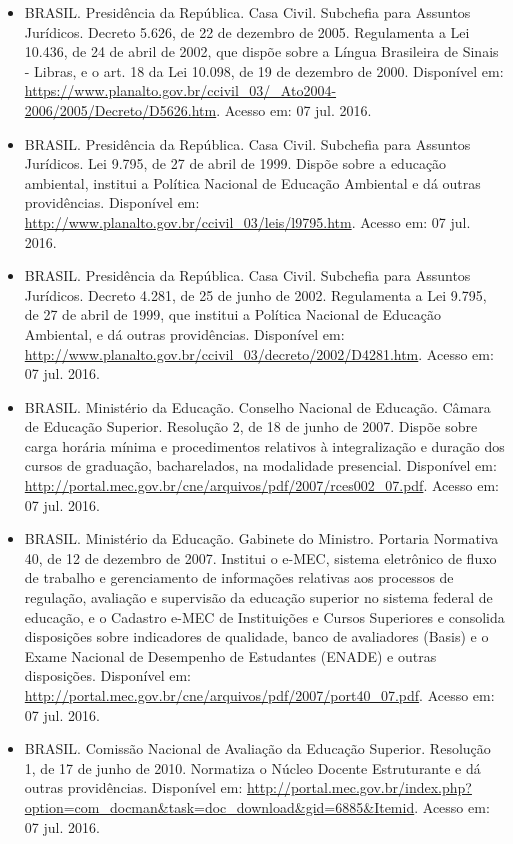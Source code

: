 \documentclass{article}
\begin{document}
\begin{itemize}
\item BRASIL. Presidência da República. Casa Civil. Subchefia para Assuntos Jurídicos. Decreto 5.626, de 22 de dezembro de 2005. Regulamenta a Lei  10.436, de 24 de abril de 2002, que dispõe sobre a Língua Brasileira de Sinais - Libras, e o art. 18 da Lei 10.098, de 19 de dezembro de 2000. Disponível em: \url{https://www.planalto.gov.br/ccivil_03/_Ato2004-2006/2005/Decreto/D5626.htm}. Acesso em: 07 jul. 2016.

\item  BRASIL. Presidência da República. Casa Civil. Subchefia para Assuntos Jurídicos. Lei 9.795, de 27 de abril de 1999. Dispõe sobre a educação ambiental, institui a Política Nacional de Educação Ambiental e dá outras providências. Disponível em: \url{http://www.planalto.gov.br/ccivil_03/leis/l9795.htm}. Acesso em: 07 jul. 2016.

\item BRASIL. Presidência da República. Casa Civil. Subchefia para Assuntos Jurídicos. Decreto 4.281, de 25 de junho de 2002. Regulamenta a Lei 9.795, de 27 de abril de 1999, que institui a Política Nacional de Educação Ambiental, e dá outras providências. Disponível em: \url{http://www.planalto.gov.br/ccivil_03/decreto/2002/D4281.htm}. Acesso em: 07 jul. 2016.

\item BRASIL. Ministério da Educação. Conselho Nacional de Educação. Câmara de Educação Superior. Resolução 2, de 18 de junho de 2007. Dispõe sobre carga horária mínima e procedimentos relativos à integralização e duração dos cursos de graduação, bacharelados, na modalidade presencial. Disponível em: \url{http://portal.mec.gov.br/cne/arquivos/pdf/2007/rces002_07.pdf}. Acesso em: 07 jul. 2016.

\item BRASIL. Ministério da Educação. Gabinete do Ministro. Portaria Normativa 40, de 12 de dezembro de 2007. Institui o e-MEC, sistema eletrônico de fluxo de trabalho e gerenciamento de informações relativas aos processos de regulação, avaliação e supervisão da educação superior no sistema federal de educação, e o Cadastro e-MEC de Instituições e Cursos Superiores e consolida disposições sobre indicadores de qualidade, banco de avaliadores (Basis) e o Exame Nacional de Desempenho de Estudantes (ENADE) e outras disposições. Disponível em: \url{http://portal.mec.gov.br/cne/arquivos/pdf/2007/port40_07.pdf}. Acesso em: 07 jul. 2016.

\item BRASIL. Comissão Nacional de Avaliação da Educação Superior. Resolução 1, de 17 de junho de 2010. Normatiza o Núcleo Docente Estruturante e dá outras providências. Disponível em: \url{http://portal.mec.gov.br/index.php?option=com_docman&task=doc_download&gid=6885&Itemid}. Acesso em: 07 jul. 2016.


\end{itemize}
\end{document}
